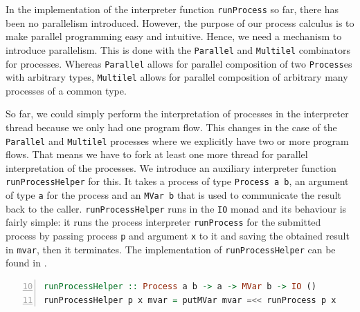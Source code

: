 In the implementation of the interpreter function \texttt{runProcess} so far, there has been no parallelism introduced. However, the purpose of our process calculus is to make parallel programming easy and intuitive. Hence, we need a mechanism to introduce parallelism. This is done with the \texttt{Parallel} and \texttt{Multilel} combinators for processes. Whereas \texttt{Parallel} allows for parallel composition of two \texttt{Process}es with arbitrary types, \texttt{Multilel} allows for parallel composition of arbitrary many processes of a common type.

So far, we could simply perform the interpretation of processes in the interpreter thread because we only had one program flow. This changes in the case of the \texttt{Parallel} and \texttt{Multilel} processes where we explicitly have two or more program flows. That means we have to fork at least one more thread for parallel interpretation of the processes. We introduce an auxiliary interpreter function \texttt{runProcessHelper} for this. It takes a process of type \texttt{Process a b}, an argument of type \texttt{a} for the process and an \texttt{MVar b} that is used to communicate the result back to the caller. \texttt{runProcessHelper} runs in the \texttt{IO} monad and its behaviour is fairly simple: it runs the process interpreter \texttt{runProcess} for the submitted process by passing process \texttt{p} and argument \texttt{x} to it and saving the obtained result in \texttt{mvar}, then it terminates. The implementation of \texttt{runProcessHelper} can be found in .
\begin{lstlisting}[language=Haskell,caption=Auxiliary process for the interpretation of \texttt{Parallel} and \texttt{Multilel} processes.,label=lst:local_runprocesshelper,numbers=left,frame=bt,firstnumber=10]
runProcessHelper :: Process a b -> a -> MVar b -> IO ()
runProcessHelper p x mvar = putMVar mvar =<< runProcess p x
\end{lstlisting}


